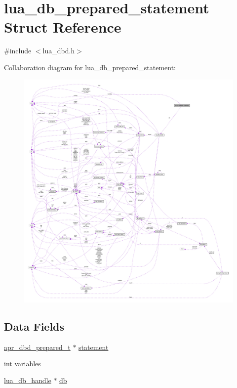 \hypertarget{structlua__db__prepared__statement}{}\section{lua\+\_\+db\+\_\+prepared\+\_\+statement Struct Reference}
\label{structlua__db__prepared__statement}


{\ttfamily \#include $<$lua\+\_\+dbd.\+h$>$}



Collaboration diagram for lua\+\_\+db\+\_\+prepared\+\_\+statement\+:
\nopagebreak
\begin{figure}[H]
\begin{center}
\leavevmode
\includegraphics[width=350pt]{structlua__db__prepared__statement__coll__graph}
\end{center}
\end{figure}
\subsection*{Data Fields}
\begin{DoxyCompactItemize}
\item 
\hyperlink{group__APR__Util__DBD_ga1f1179c6480a2ee0134f2cb881106cd3}{apr\+\_\+dbd\+\_\+prepared\+\_\+t} $\ast$ \hyperlink{structlua__db__prepared__statement_ad29b98c7951db2947945a6cd2c0733e1}{statement}
\item 
\hyperlink{pcre_8txt_a42dfa4ff673c82d8efe7144098fbc198}{int} \hyperlink{structlua__db__prepared__statement_a696bd485fc4b6ab3e9b6474a332db6c8}{variables}
\item 
\hyperlink{structlua__db__handle}{lua\+\_\+db\+\_\+handle} $\ast$ \hyperlink{structlua__db__prepared__statement_aa0e4fb9c42fa26d8c00eec7a2450ec32}{db}
\end{DoxyCompactItemize}


